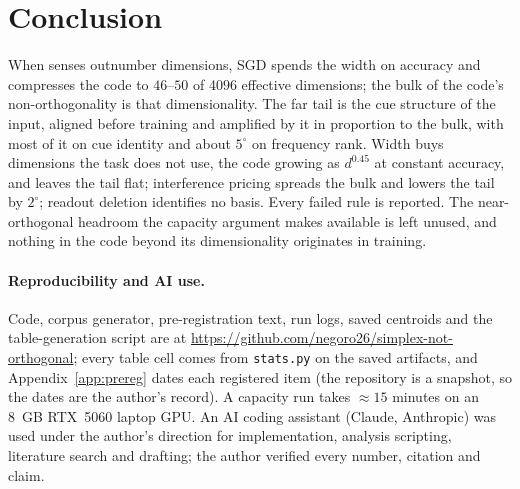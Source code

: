 \documentclass{article}
\newcommand{\degr}{^{\circ}}
\begin{document}
\section{Conclusion}

When senses outnumber dimensions, SGD spends the width on accuracy and compresses
the code to $46$--$50$ of $4096$ effective dimensions; the bulk of the code's
non-orthogonality is that dimensionality. The far tail is the cue structure of the
input, aligned before training and amplified by it in proportion to the bulk, with
most of it on cue identity and about $5\degr$ on frequency rank. Width buys
dimensions the task does not use, the code growing as $d^{0.45}$ at constant
accuracy, and leaves the tail flat; interference pricing spreads the bulk and
lowers the tail by $2\degr$; readout deletion identifies no basis. Every failed rule is reported.
The near-orthogonal headroom the capacity argument makes available is left unused,
and nothing in the code beyond its dimensionality originates in training.

\paragraph{Reproducibility and AI use.} Code, corpus generator, pre-registration text,
run logs, saved centroids and the table-generation script are at
\url{https://github.com/negoro26/simplex-not-orthogonal}; every table cell comes from
\texttt{stats.py} on the saved artifacts, and Appendix~\ref{app:prereg} dates each
registered item (the repository is a snapshot, so the dates are the author's record). A
capacity run takes $\approx15$ minutes on an 8~GB RTX~5060 laptop GPU\@. An AI coding
assistant (Claude, Anthropic) was used under the author's direction for implementation,
analysis scripting, literature search and drafting; the author verified every number,
citation and claim.




\appendix
\end{document}
